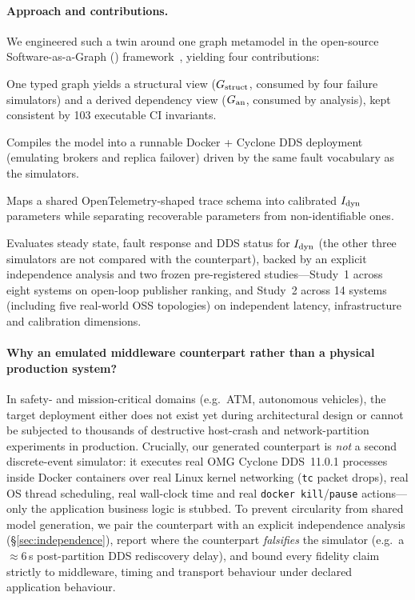 \paragraph{Approach and contributions.} We engineered such a twin around one graph metamodel in the open-source Software-as-a-Graph (\SaG) framework~\citep{sag-software}, yielding four contributions:
\begin{description}[leftmargin=1em,style=nextline,nosep]
  \item[C1: Single metamodel with enforced view separation (\S\ref{sec:twin}).] One typed graph yields a structural view ($G_{\mathrm{struct}}$, consumed by four failure simulators) and a derived dependency view ($G_{\mathrm{an}}$, consumed by analysis), kept consistent by 103 executable CI invariants.
  \item[C2: Model-to-system (M2S) transformation (\S\ref{sec:m2s}).] Compiles the model into a runnable Docker + Cyclone DDS deployment (emulating brokers and replica failover) driven by the same fault vocabulary as the simulators.
  \item[C3: System-to-model (S2M) calibration and identifiability (\S\ref{sec:s2m}).] Maps a shared OpenTelemetry-shaped trace schema into calibrated $I_{\mathrm{dyn}}$ parameters while separating recoverable parameters from non-identifiable ones.
  \item[C4: Bounded, pre-registered fidelity assessment (\S\ref{sec:fidelity}).] Evaluates steady state, fault response and DDS status for $I_{\mathrm{dyn}}$ (the other three simulators are not compared with the counterpart), backed by an explicit independence analysis and two frozen pre-registered studies---Study~1 across eight systems on open-loop publisher ranking, and Study~2 across 14 systems (including five real-world OSS topologies) on independent latency, infrastructure and calibration dimensions.
\end{description}

\paragraph{Why an emulated middleware counterpart rather than a physical production system?} In safety- and mission-critical domains (e.g.\ ATM, autonomous vehicles), the target deployment either does not exist yet during architectural design or cannot be subjected to thousands of destructive host-crash and network-partition experiments in production. Crucially, our generated counterpart is \emph{not} a second discrete-event simulator: it executes real OMG Cyclone DDS~11.0.1 processes inside Docker containers over real Linux kernel networking (\texttt{tc} packet drops), real OS thread scheduling, real wall-clock time and real \texttt{docker kill}/\texttt{pause} actions---only the application business logic is stubbed. To prevent circularity from shared model generation, we pair the counterpart with an explicit independence analysis (\S\ref{sec:independence}), report where the counterpart \emph{falsifies} the simulator (e.g.\ a $\approx 6$\,s post-partition DDS rediscovery delay), and bound every fidelity claim strictly to middleware, timing and transport behaviour under declared application behaviour.

